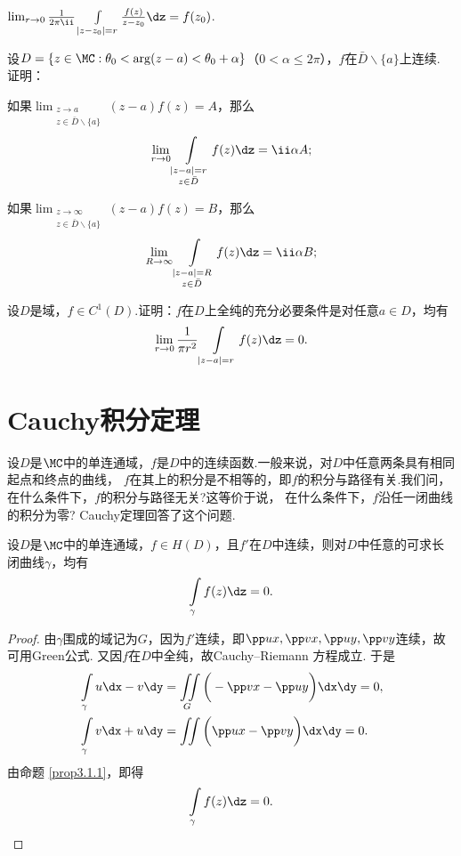 \begin{xiti}
\begin{enuma}
    \item $\lim_{r\to0}\frac1{2\pi\ii}\int\limits_{|z-z_0|=r}\frac{f(z)}{z-z_0}\dz=f(z_0)$.
  \end{enuma}
\item 设$D=\{z\in\MC:\theta_0<\arg(z-a)<\theta_0+\alpha\}$（$0<\alpha\le2\pi$），$f$在$\bar D\backslash\{a\}$上连续. 证明：
\begin{enuma}
  \item 如果$\lim_{\substack{z\to a\\z\in\bar D\backslash\{a\}}}(z-a)f(z)=A$，那么
  \[\lim_{r\to0}\int\limits_{\substack{|z-a|=r\\z\in\bar D}}f(z)\dz=\ii\alpha A;\]
  \item 如果$\lim_{\substack{z\to \infty\\z\in\bar D\backslash\{a\}}}(z-a)f(z)=B$，那么
  \[\lim_{R\to\infty}\int\limits_{\substack{|z-a|=R\\z\in \bar D}}f(z)\dz=\ii\alpha B;\]
\end{enuma}
\item 设$D$是域，$f\in C^1(D)$.证明：$f$在$D$上全纯的充分必要条件是对任意$a\in D$，均有
\[\lim_{r\to0}\frac1{\pi r^2}\int\limits_{|z-a|=r}f(z)\dz=0.\]
\end{xiti}

\section{Cauchy积分定理\label{sec3.2}}
设$D$是$\MC$中的单连通域，$f$是$D$中的连续函数.一般来说，对$D$中任意两条具有相同起点和终点的曲线，
$f$在其上的积分是不相等的，即$f$的积分与路径有关.我们问，在什么条件下，$f$的积分与路径无关?这等价于说，
在什么条件下，$f$沿任一闭曲线的积分为零? Cauchy定理回答了这个问题.
\begin{theorem}\label{thm3.2.1}
设$D$是$\MC$中的单连通域，$f\in H(D)$，且$f'$在$D$中连续，则对$D$中任意的可求长闭曲线$\gamma$，均有
\[\int\limits_\gamma f(z)\dz=0.\]
\end{theorem}
\begin{proof}
由$\gamma$围成的域记为$G$，因为$f'$连续，即$\pp ux,\pp vx,\pp uy,\pp vy$连续，故可用Green公式. 
又因$f$在$D$中全纯，故Cauchy--Riemann 方程成立. 于是
\begin{align*}
&\int\limits_\gamma u\dx-v\dy=\iint\limits_G\bigg(-\pp vx-\pp uy\bigg)\dx\dy=0,\\
&\int\limits_\gamma v\dx+u\dy=\iint\limits\bigg(\pp ux-\pp vy\bigg)\dx\dy=0.
\end{align*}
由命题 \ref{prop3.1.1}，即得
\begin{equation*}
  \int\limits_\gamma f(z)\dz=0.
\end{equation*}
\end{proof}

